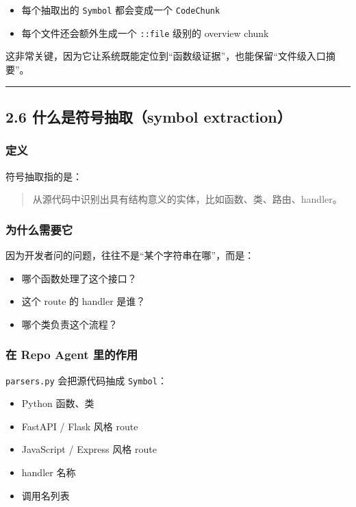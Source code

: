 \documentclass[UTF8,12pt,openany]{ctexbook}
\begin{document}
\begin{itemize}
\item 每个抽取出的 \texttt{Symbol} 都会变成一个 \texttt{CodeChunk}
\item 每个文件还会额外生成一个 \texttt{::file} 级别的 overview chunk
\end{itemize}

这非常关键，因为它让系统既能定位到“函数级证据”，也能保留“文件级入口摘要”。\par

\hrule

\subsection{2.6 什么是符号抽取（symbol extraction）}

\subsubsection{定义}

符号抽取指的是：\par

\begin{quote}
从源代码中识别出具有结构意义的实体，比如函数、类、路由、handler。
\end{quote}

\subsubsection{为什么需要它}

因为开发者问的问题，往往不是“某个字符串在哪”，而是：\par

\begin{itemize}
\item 哪个函数处理了这个接口？
\item 这个 route 的 handler 是谁？
\item 哪个类负责这个流程？
\end{itemize}

\subsubsection{在 Repo Agent 里的作用}

\texttt{parsers.py} 会把源代码抽成 \texttt{Symbol}：\par

\begin{itemize}
\item Python 函数、类
\item FastAPI / Flask 风格 route
\item JavaScript / Express 风格 route
\item handler 名称
\item 调用名列表
\end{itemize}
\end{document}
